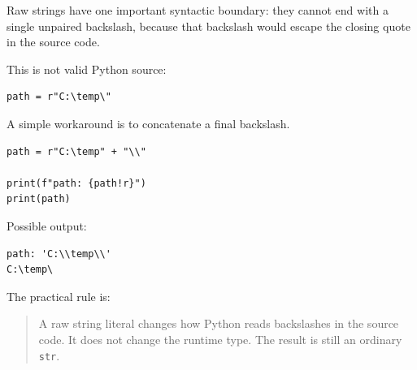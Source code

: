 Raw strings have one important syntactic boundary: they cannot end with a single unpaired backslash, because that backslash would escape the closing quote in the source code.

This is not valid Python source:

\begin{verbatim}
path = r"C:\temp\"
\end{verbatim}

A simple workaround is to concatenate a final backslash.

\begin{verbatim}
path = r"C:\temp" + "\\"

print(f"path: {path!r}")
print(path)
\end{verbatim}

Possible output:

\begin{verbatim}
path: 'C:\\temp\\'
C:\temp\
\end{verbatim}

The practical rule is:

\begin{quote}
A raw string literal changes how Python reads backslashes in the source code. It does not change the runtime type. The result is still an ordinary \texttt{str}.
\end{quote}